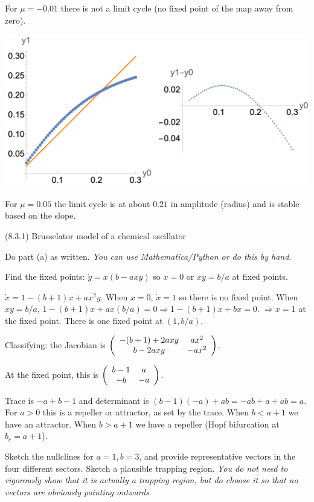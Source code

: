 \documentclass[12pt,letterpaper,answers]{exam}
\begin{document}
\begin{questions}
\begin{solution}
For $\mu = -0.01$ there is not a limit cycle (no fixed point of the map away from zero).

\includegraphics[width=\textwidth]{img/PS08S23poincaremap5.png}

For $\mu = 0.05$ the limit cycle is at about $0.21$ in amplitude (radius) and is stable based on the slope.

\end{solution}

\question (8.3.1) Brusselator model of a chemical oscillator
\begin{parts}
\item Do part (a) as written.  \emph{You can use Mathematica/Python or do this by hand}.
\begin{solution}
Find the fixed points: $\dot y = x(b-axy)$ so $x=0$ or $xy = b/a$ at fixed points.

$\dot x = 1-(b+1)x + ax^2y$.  When $x = 0$, $\dot x = 1$ so there is no fixed point.  When $xy = b/a$, $1-(b+1)x + ax(b/a) = 0 \Rightarrow 1 -(b+1)x + b x = 0$.  $\Rightarrow x = 1$ at the fixed point.  There is one fixed point at $(1, b/a)$.

Classifying: the Jacobian is $\left(\begin{array}{c c} 
-(b+1) + 2axy & ax^2 \\
b - 2axy & -ax^2\end{array}\right)$.

At the fixed point, this is $\left(\begin{array}{c c} 
b-1 & a \\
-b & -a\end{array}\right)$.

Trace is $-a + b - 1$ and determinant is $(b-1)(-a)+ab = -ab + a + ab = a$.  For $a>0$ this is a repeller or attractor, as set by the trace.  When $b<a+1$ we have an attractor.  When $b>a+1$ we have a repeller (Hopf bifurcation at $b_c = a+1$).
\end{solution}
\item Sketch the nullclines for $a=1,b=3$, and provide representative vectors in the four different sectors.  Sketch a plausible trapping region.  \emph{You do not need to rigorously show that it is actually a trapping region, but do choose it so that no vectors are obviously pointing outwards}.
\begin{solution}


\end{solution}
\end{parts}
\end{questions}
\end{document}
